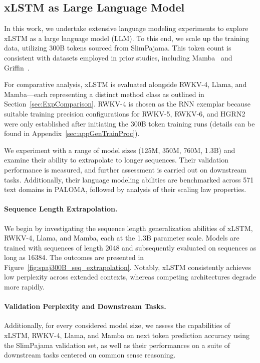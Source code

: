 \subsection{xLSTM as Large Language Model}
\label{sec:ExpLanguage}

In this work, we undertake extensive language modeling experiments to explore xLSTM as a large language model (LLM). To this end, we scale up the training data, utilizing 300B tokens sourced from SlimPajama. This token count is consistent with datasets employed in prior studies, including Mamba~\citep{Gu:24arxiv} and Griffin~\citep{De:24arxiv}.

For comparative analysis, xLSTM is evaluated alongside RWKV-4, Llama, and Mamba—each representing a distinct method class as outlined in Section~\ref{sec:ExpComparison}. RWKV-4 is chosen as the RNN exemplar because suitable training precision configurations for RWKV-5, RWKV-6, and HGRN2 were only established after initiating the 300B token training runs (details can be found in Appendix~\ref{sec:appGenTrainProc}).

We experiment with a range of model sizes (125M, 350M, 760M, 1.3B) and examine their ability to extrapolate to longer sequences. Their validation performance is measured, and further assessment is carried out on downstream tasks. Additionally, their language modeling abilities are benchmarked across 571 text domains in PALOMA, followed by analysis of their scaling law properties.

\paragraph{Sequence Length Extrapolation.}
\label{sec:spaj300B_ctx_extrapolation}
We begin by investigating the sequence length generalization abilities of xLSTM, RWKV-4, Llama, and Mamba, each at the 1.3B parameter scale. Models are trained with sequences of length 2048 and subsequently evaluated on sequences as long as 16384. The outcomes are presented in Figure~\ref{fig:spaj300B_seq_extrapolation}. Notably, xLSTM consistently achieves low perplexity across extended contexts, whereas competing architectures degrade more rapidly.

\paragraph{Validation Perplexity and Downstream Tasks.}
\label{sec:spaj_downstream_eval}
Additionally, for every considered model size, we assess the capabilities of xLSTM, RWKV-4, Llama, and Mamba on next token prediction accuracy using the SlimPajama validation set, as well as their performances on a suite of downstream tasks centered on common sense reasoning.

